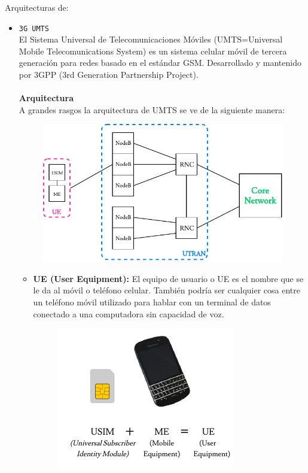 {\color{red} Arquitecturas de:}
\begin{itemize}
	\item {\color{red}\texttt{3G UMTS}}\\
	El Sistema Universal de Telecomunicaciones Móviles (UMTS=Universal Mobile Telecomunications System) es un sistema celular móvil de tercera generación para redes basado en el estándar GSM. Desarrollado y mantenido por 3GPP (3rd Generation Partnership Project). \\{ }\\
	\textbf{Arquitectura}\\
	A grandes rasgos la arquitectura de UMTS se ve de la siguiente manera:
	\begin{figure}[ht!]
	\centering
	\includegraphics[scale=0.9]{Imagenes/arqUMTS.pdf}
	\end{figure}
	\begin{itemize}
		\item \textbf{UE (User Equipment):} El equipo de usuario o UE es el nombre que se le da al móvil o teléfono celular. También podría ser cualquier cosa entre un teléfono móvil utilizado para hablar con un terminal de datos conectado a una computadora sin capacidad de voz.
			\begin{figure}[ht!]
	\centering
	\includegraphics[scale=0.85]{Imagenes/arqUMTS_UE.pdf}
	\end{figure}
		

\end{itemize}
\end{itemize}
